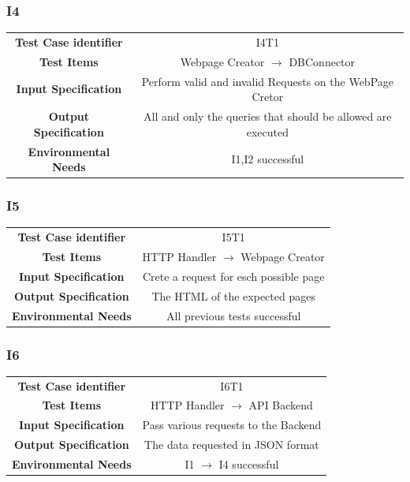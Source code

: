 \documentclass{article}
\begin{document}
\subsubsection{I4}
\begin{adjustbox}{width=1.2\textwidth}	
	\begin{tabular}{*{2}{c}}
		\toprule
		\textbf{Test Case identifier} & I4T1\\
		\textbf{Test Items} & Webpage Creator $\rightarrow$ DBConnector\\
		\textbf{Input Specification} & Perform valid and invalid Requests on the WebPage Cretor\\
		\textbf{Output Specification} & All and only the queries that should be allowed are executed\\
		\textbf{Environmental Needs} & I1,I2 successful\\
		\bottomrule
	\end{tabular}
\end{adjustbox}
\subsubsection{I5}
\begin{adjustbox}{width=1.2\textwidth}	
	\begin{tabular}{*{2}{c}}
		\toprule
		\textbf{Test Case identifier} & I5T1\\
		\textbf{Test Items} & HTTP Handler $\rightarrow$ Webpage Creator\\
		\textbf{Input Specification} & Crete a request for esch possible page\\
		\textbf{Output Specification} & The HTML of the expected pages\\
		\textbf{Environmental Needs} & All previous tests successful\\
		\bottomrule
	\end{tabular}
\end{adjustbox}
\subsubsection{I6}
\begin{adjustbox}{width=1.2\textwidth}	
	\begin{tabular}{*{2}{c}}
		\toprule
		\textbf{Test Case identifier} & I6T1\\
		\textbf{Test Items} & HTTP Handler $\rightarrow$ API Backend \\
		\textbf{Input Specification} & Pass various requests to the Backend\\
		\textbf{Output Specification} & The data requested in JSON format\\
		\textbf{Environmental Needs} & I1 $\rightarrow$ I4 successful\\
		\bottomrule
	\end{tabular}
\end{adjustbox}
\end{document}
